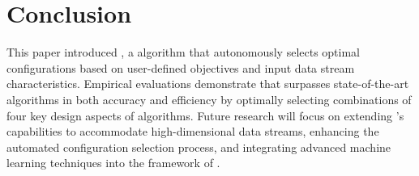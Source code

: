 \section{Conclusion}
\label{sec:conclusion}
This paper introduced \algo, a \dsc algorithm that autonomously selects optimal configurations based on user-defined objectives and input data stream characteristics. Empirical evaluations demonstrate that \algo surpasses state-of-the-art algorithms in both accuracy and efficiency by optimally selecting combinations of four key design aspects of \dsc algorithms. Future research will focus on extending \algo's capabilities to accommodate high-dimensional data streams, enhancing the automated configuration selection process, and integrating advanced machine learning techniques into the framework of \algo.
